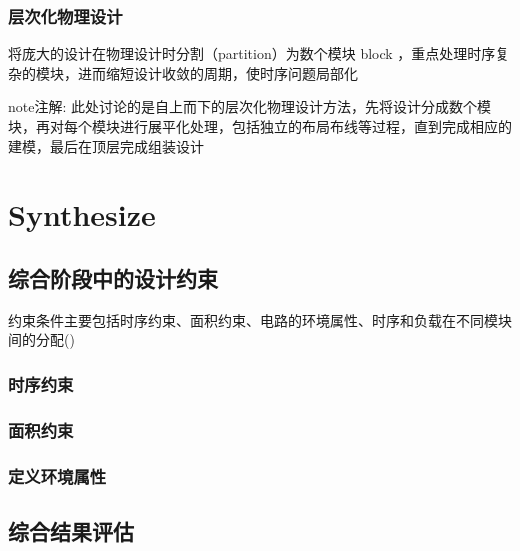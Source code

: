 \documentclass[letterpaper,10pt,english]{sphinxmanual}
\begin{document}
\subsection{层次化物理设计}
\label{\detokenize{chapter3/index:id2}}
\sphinxAtStartPar
将庞大的设计在物理设计时分割（partition）为数个模块 block ，重点处理时序复杂的模块，进而缩短设计收敛的周期，使时序问题局部化

\begin{sphinxadmonition}{note}{注解:}
\sphinxAtStartPar
此处讨论的是自上而下的层次化物理设计方法，先将设计分成数个模块，再对每个模块进行展平化处理，包括独立的布局布线等过程，直到完成相应的建模，最后在顶层完成组装设计
\end{sphinxadmonition}


\chapter{Synthesize}
\label{\detokenize{chapter4/index:synthesize}}\label{\detokenize{chapter4/index::doc}}

\section{综合阶段中的设计约束}
\label{\detokenize{chapter4/_u7efc_u5408_u9636_u6bb5_u4e2d_u7684_u8bbe_u8ba1_u7ea6_u675f:id1}}\label{\detokenize{chapter4/_u7efc_u5408_u9636_u6bb5_u4e2d_u7684_u8bbe_u8ba1_u7ea6_u675f::doc}}
\sphinxAtStartPar
约束条件主要包括时序约束、面积约束、电路的环境属性、时序和负载在不同模块间的分配()


\subsection{时序约束}
\label{\detokenize{chapter4/_u7efc_u5408_u9636_u6bb5_u4e2d_u7684_u8bbe_u8ba1_u7ea6_u675f:id2}}

\subsection{面积约束}
\label{\detokenize{chapter4/_u7efc_u5408_u9636_u6bb5_u4e2d_u7684_u8bbe_u8ba1_u7ea6_u675f:id3}}

\subsection{定义环境属性}
\label{\detokenize{chapter4/_u7efc_u5408_u9636_u6bb5_u4e2d_u7684_u8bbe_u8ba1_u7ea6_u675f:id4}}

\section{综合结果评估}
\label{\detokenize{chapter4/_u7efc_u5408_u7ed3_u679c_u8bc4_u4f30:id1}}\label{\detokenize{chapter4/_u7efc_u5408_u7ed3_u679c_u8bc4_u4f30::doc}}
\end{document}
